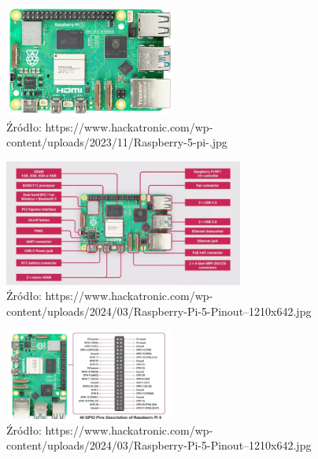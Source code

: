 \documentclass[magisterska]{pracadypl}
\begin{document}
\begin{figure}[h]  %
    \centering  %
    \includegraphics[width=0.5\textwidth]{images/RPI.jpg}  %
    \captionsetup{labelformat=empty, font=footnotesize}
    \caption{Źródło: https://www.hackatronic.com/wp-content/uploads/2023/11/Raspberry-5-pi-.jpg}
    \label{fig:rpi}  %
\end{figure}

\begin{figure}[h]  %
    \centering  %
    \includegraphics[width=0.7\textwidth]{images/RPI-SPEC.jpg}  %
    \captionsetup{labelformat=empty, font=footnotesize}
    \caption{Źródło: https://www.hackatronic.com/wp-content/uploads/2024/03/Raspberry-Pi-5-Pinout--1210x642.jpg}
    \label{fig:rpi-spec}  %
\end{figure}

\begin{figure}[h]  %
    \centering  %
    \includegraphics[width=0.5\textwidth]{images/RPI-PIN.jpg}  %
    \captionsetup{labelformat=empty, font=footnotesize}
    \caption{Źródło: https://www.hackatronic.com/wp-content/uploads/2024/03/Raspberry-Pi-5-Pinout--1210x642.jpg}
    \label{fig:rpi-gpio}  %
\end{figure}
\end{document}
